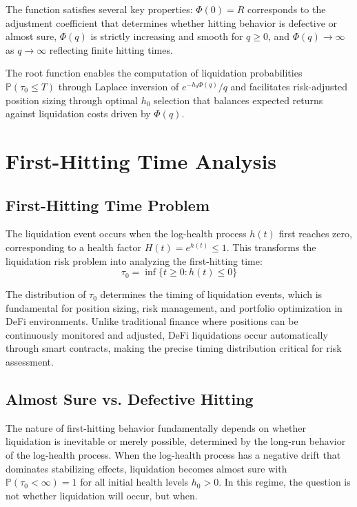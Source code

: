 \documentclass{article}
\theoremstyle{definition}
\begin{document}
The function satisfies several key properties: $\Phi(0) = R$ corresponds to the adjustment coefficient that determines whether hitting behavior is defective or almost sure, $\Phi(q)$ is strictly increasing and smooth for $q \geq 0$, and $\Phi(q) \to \infty$ as $q \to \infty$ reflecting finite hitting times.

The root function enables the computation of liquidation probabilities $\mathbb{P}(\tau_0 \leq T)$ through Laplace inversion of $e^{-h_0 \Phi(q)}/q$ and facilitates risk-adjusted position sizing through optimal $h_0$ selection that balances expected returns against liquidation costs driven by $\Phi(q)$.

\section{First-Hitting Time Analysis}

\subsection{First-Hitting Time Problem}

The liquidation event occurs when the log-health process $h(t)$ first reaches zero, corresponding to a health factor $H(t) = e^{h(t)} \leq 1$. This transforms the liquidation risk problem into analyzing the first-hitting time:
\begin{equation}
\tau_0 = \inf\{t \geq 0 : h(t) \leq 0\}
\end{equation}

The distribution of $\tau_0$ determines the timing of liquidation events, which is fundamental for position sizing, risk management, and portfolio optimization in DeFi environments. Unlike traditional finance where positions can be continuously monitored and adjusted, DeFi liquidations occur automatically through smart contracts, making the precise timing distribution critical for risk assessment.

\subsection{Almost Sure vs. Defective Hitting}

The nature of first-hitting behavior fundamentally depends on whether liquidation is inevitable or merely possible, determined by the long-run behavior of the log-health process. When the log-health process has a negative drift that dominates stabilizing effects, liquidation becomes almost sure with $\mathbb{P}(\tau_0 < \infty) = 1$ for all initial health levels $h_0 > 0$. In this regime, the question is not whether liquidation will occur, but when.
\end{document}
